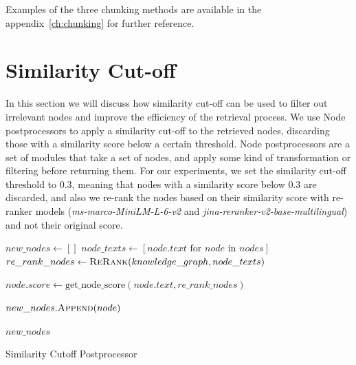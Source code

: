 Examples of the three chunking methods are available in the appendix~\ref{ch:chunking} for further reference.

\section{Similarity Cut-off}\label{sec:similar-cut-off}
In this section we will discuss how similarity cut-off can be used to filter out irrelevant nodes and improve the efficiency of the retrieval process.
We use Node postprocessors to apply a similarity cut-off to the retrieved nodes, discarding those with a similarity score below a certain threshold.
Node postprocessors are a set of modules that take a set of nodes, and apply some kind of transformation or filtering before returning them.
For our experiments, we set the similarity cut-off threshold to 0.3, meaning that nodes with a similarity score below 0.3 are discarded, and also we re-rank the nodes based on their similarity score with re-ranker models (\textit{ms-marco-MiniLM-L-6-v2} and \textit{jina-reranker-v2-base-multilingual}) and not their original score.

\begin{algorithm}
    \begin{algorithmic}[1]
            \State $new\_nodes \gets []$
            \State $node\_texts \gets [node.text \text{ for } node \text{ in } nodes]$
            \State $re\_rank\_nodes \gets \textsc{ReRank}(knowledge\_graph, node\_texts)$

                \State $node.score \gets \text{get\_node\_score}(node.text, re\_rank\_nodes)$

                    \State $new\_nodes.\textsc{Append}(node)$
                \EndIf
            \EndFor

            \State \Return $new\_nodes$
        \EndProcedure
    \end{algorithmic}
    \caption{Similarity Cutoff Postprocessor}\label{alg:algorithm}
\end{algorithm}

